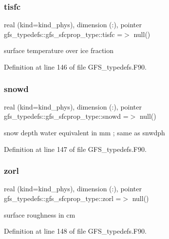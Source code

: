 \subsubsection{tisfc}
{\footnotesize\ttfamily real (kind=kind\+\_\+phys), dimension  (\+:), pointer gfs\+\_\+typedefs\+::gfs\+\_\+sfcprop\+\_\+type\+::tisfc =$>$ null()}



surface temperature over ice fraction 



Definition at line 146 of file G\+F\+S\+\_\+typedefs.\+F90.

\mbox{\label{structgfs__typedefs_1_1gfs__sfcprop__type_a012dc1d4913635ea9b73f323d07eb2ca}} 
\subsubsection{snowd}
{\footnotesize\ttfamily real (kind=kind\+\_\+phys), dimension  (\+:), pointer gfs\+\_\+typedefs\+::gfs\+\_\+sfcprop\+\_\+type\+::snowd =$>$ null()}



snow depth water equivalent in mm ; same as snwdph 



Definition at line 147 of file G\+F\+S\+\_\+typedefs.\+F90.

\mbox{\label{structgfs__typedefs_1_1gfs__sfcprop__type_a64d2b7400e651044b395167ccb8b1d85}} 
\subsubsection{zorl}
{\footnotesize\ttfamily real (kind=kind\+\_\+phys), dimension   (\+:), pointer gfs\+\_\+typedefs\+::gfs\+\_\+sfcprop\+\_\+type\+::zorl =$>$ null()}



surface roughness in cm 



Definition at line 148 of file G\+F\+S\+\_\+typedefs.\+F90.

\mbox{\label{structgfs__typedefs_1_1gfs__sfcprop__type_ad65d9958b96e06eca05c75a741189bee}} 
